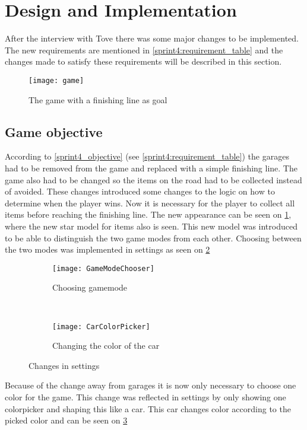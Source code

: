 \section{Design and Implementation}
After the interview with Tove there was some major changes to be implemented.
The new requirements are mentioned in \cref{sprint4:requirement_table} and the changes made to satisfy these requirements will be described in this section.

\begin{figure}
\texttt{[image: game]}
\caption{The game with a finishing line as goal}
\label{game_with_finishing_line}
\end{figure}

\subsection{Game objective}\label{s4_gameobjective}
According to \cref{sprint4_objective} (see \cref{sprint4:requirement_table}) the garages had to be removed from the game and replaced with a simple finishing line.
The game also had to be changed so the items on the road had to be collected instead of avoided.
These changes introduced some changes to the logic on how to determine when the player wins.
Now it is necessary for the player to collect all items before reaching the finishing line. 
The new appearance can be seen on \cref{game_with_finishing_line}, where the new star model for items also is seen.
This new model was introduced to be able to distinguish the two game modes from each other.
Choosing between the two modes was implemented in settings as seen on \cref{gamemode}


\begin{figure}
\begin{subfigure}{0.5\textwidth}
\centering
\texttt{[image: GameModeChooser]}
\caption{Choosing gamemode}
\label{gamemode}
\end{subfigure}
~
\begin{subfigure}{0.5\textwidth}
\centering
\texttt{[image: CarColorPicker]}
\caption{Changing the color of the car}
\label{carcolor}
\end{subfigure}
\caption{Changes in settings}
\label{Settings}
\end{figure}

Because of the change away from garages it is now only necessary to choose one color for the game. 
This change was reflected in settings by only showing one colorpicker and shaping this like a car.
This car changes color according to the picked color and can be seen on \cref{carcolor}

